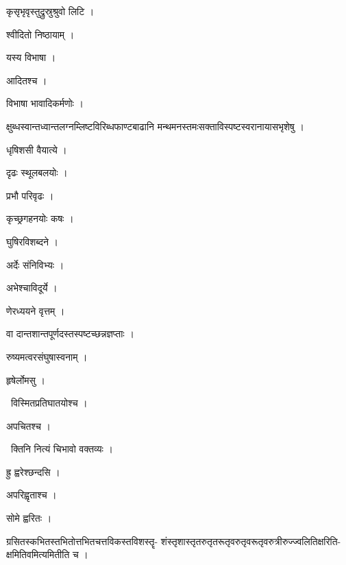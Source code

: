 \documentclass[10pt, openany, oneside]{book}
\begin{document}
\noindent कृसृभृवृस्तुद्रुस्रुश्रुवो लिटि ।

\noindent श्वीदितो निष्ठायाम् ।

\noindent यस्य विभाषा ।

\noindent आदितश्च ।

\noindent विभाषा भावादिकर्मणोः ।

\noindent क्षुब्धस्वान्तध्वान्तलग्नम्लिष्टविरिब्धफाण्टबाढानि मन्थमनस्तमःसक्ताविस्पष्टस्वरानायासभृशेषु ।

\noindent धृषिशसी वैयात्ये ।

\noindent दृढः स्थूलबलयोः ।

\noindent प्रभौ परिवृढः ।

\noindent कृच्छ्रगहनयोः कषः ।

\noindent घुषिरविशब्दने ।

\noindent अर्देः संनिविभ्यः ।

\noindent अभेश्चाविदूर्ये ।

\noindent णेरध्ययने वृत्तम् ।

\noindent वा दान्तशान्तपूर्णदस्तस्पष्टच्छन्नज्ञप्ताः ।

\noindent रुष्यमत्वरसंघुषास्वनाम् ।

\noindent हृषेर्लोमसु ।

\par\noindent\hspace{1.5em}{\vps वा॰}~{\qt विस्मितप्रतिघातयोश्च ।}

\noindent अपचितश्च ।

\par\noindent\hspace{1.5em}{\vps वा॰}~{\qt क्तिनि नित्यं चिभावो वक्तव्यः ।}

\noindent ह्रु ह्वरेश्छन्दसि ।

\noindent अपरिह्वृताश्च ।

\noindent सोमे ह्वरितः ।

\noindent ग्रसितस्कभितस्तभितोत्तभितचत्तविकस्तविशस्तॄ- शंस्तृशास्तृतरुतृतरूतृवरुतृवरूतृवरुत्रीरुज्ज्वलितिक्षरिति- क्षमितिवमित्यमितीति च ।
\end{document}
